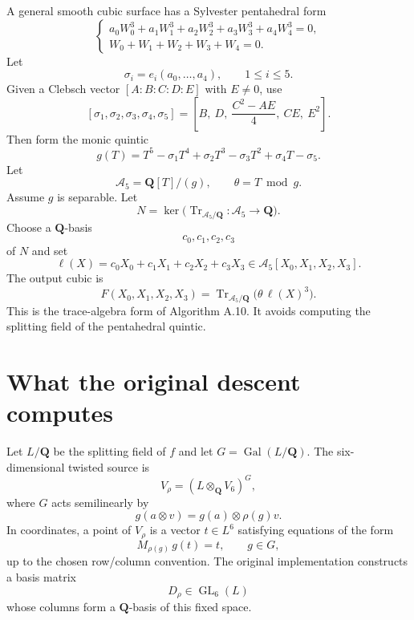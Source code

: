 \documentclass[11pt]{article}
\newcommand{\QQ}{\mathbf{Q}}
\newcommand{\Gal}{\operatorname{Gal}}
\newcommand{\Tr}{\operatorname{Tr}}
\newcommand{\cA}{\mathcal{A}}
\newcommand{\V}{V_6}
\begin{document}
A general smooth cubic surface has a Sylvester pentahedral form
\begin{equation}
\begin{cases}
 a_0W_0^3+a_1W_1^3+a_2W_2^3+a_3W_3^3+a_4W_4^3=0,\\
 W_0+W_1+W_2+W_3+W_4=0.
\end{cases}
\label{eq:sylvester}
\end{equation}
Let
\[
  \sigma_i=e_i(a_0,\ldots,a_4),\qquad 1\leq i\leq5.
\]
Given a Clebsch vector $[A:B:C:D:E]$ with $E\neq0$, use
\begin{equation}
 \boxed{
 [\sigma_1,\sigma_2,\sigma_3,\sigma_4,\sigma_5]
 =\left[B,\ D,\ \frac{C^2-AE}{4},\ CE,\ E^2\right].
 }
 \label{eq:sigma-from-clebsch}
\end{equation}
Then form the monic quintic
\begin{equation}
  g(T)=T^5-\sigma_1T^4+\sigma_2T^3-\sigma_3T^2+\sigma_4T-\sigma_5.
  \label{eq:penta-quintic}
\end{equation}
Let
\[
  \cA_5=\QQ[T]/(g),
  \qquad
  \theta=T\bmod g.
\]
Assume $g$ is separable.  Let
\[
  N=\ker\bigl(\Tr_{\cA_5/\QQ}:\cA_5\to\QQ\bigr).
\]
Choose a $\QQ$-basis
\[
  c_0,c_1,c_2,c_3
\]
of $N$ and set
\[
  \ell(X)=c_0X_0+c_1X_1+c_2X_2+c_3X_3
  \in \cA_5[X_0,X_1,X_2,X_3].
\]
The output cubic is
\begin{equation}
 \boxed{
  F(X_0,X_1,X_2,X_3)
  =\Tr_{\cA_5/\QQ}\bigl(\theta\,\ell(X)^3\bigr).
 }
 \label{eq:trace-cubic}
\end{equation}
This is the trace-algebra form of Algorithm A.10.  It avoids computing the
splitting field of the pentahedral quintic.

\section{What the original descent computes}

Let $L/\QQ$ be the splitting field of $f$ and let
$G=\Gal(L/\QQ)$.  The six-dimensional twisted source is
\begin{equation}
  V_\rho=(L\otimes_\QQ \V)^G,
  \label{eq:twisted-source}
\end{equation}
where $G$ acts semilinearly by
\[
  g(a\otimes v)=g(a)\otimes \rho(g)v.
\]
In coordinates, a point of $V_\rho$ is a vector $t\in L^6$ satisfying equations
of the form
\begin{equation}
  M_{\rho(g)}\,g(t)=t,
  \qquad g\in G,
  \label{eq:six-fixed-equation}
\end{equation}
up to the chosen row/column convention.  The original implementation constructs a
basis matrix
\[
  D_\rho\in\operatorname{GL}_6(L)
\]
whose columns form a $\QQ$-basis of this fixed space.
\end{document}
